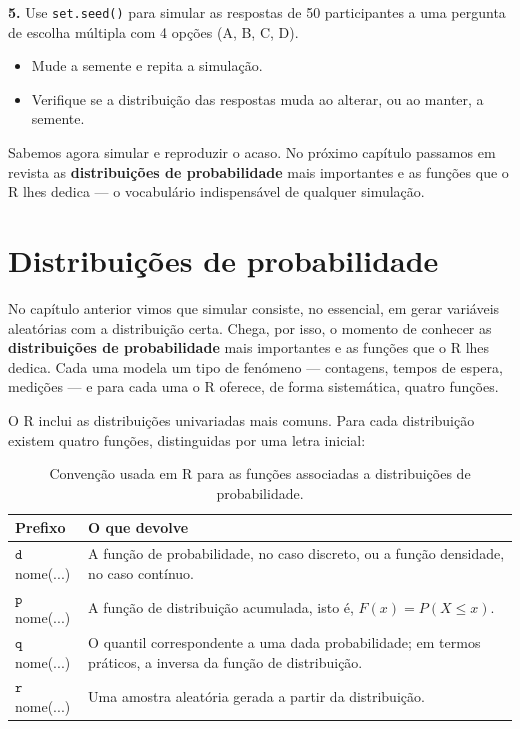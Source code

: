 \documentclass[
  portuguese,
  11pt,
  openany]{book}
\providecommand{\tightlist}{%
  \setlength{\itemsep}{0pt}\setlength{\parskip}{0pt}}
\begin{document}
\textbf{5.} Use \texttt{set.seed()} para simular as respostas de 50 participantes a uma pergunta de
escolha múltipla com 4 opções (A, B, C, D).

\begin{itemize}
\tightlist
\item
  Mude a semente e repita a simulação.
\item
  Verifique se a distribuição das respostas muda ao alterar, ou ao manter, a semente.
\end{itemize}

Sabemos agora simular e reproduzir o acaso. No próximo capítulo passamos em revista as
\textbf{distribuições de probabilidade} mais importantes e as funções que o R lhes dedica ---
o vocabulário indispensável de qualquer simulação.

\chapter{Distribuições de probabilidade}\label{distribuicoes}

No capítulo anterior vimos que simular consiste, no essencial, em gerar variáveis
aleatórias com a distribuição certa. Chega, por isso, o momento de conhecer as
\textbf{distribuições de probabilidade} mais importantes e as funções que o R lhes dedica.
Cada uma modela um tipo de fenómeno --- contagens, tempos de espera, medições --- e para
cada uma o R oferece, de forma sistemática, quatro funções.

O R inclui as distribuições univariadas mais comuns. Para cada distribuição existem
quatro funções, distinguidas por uma letra inicial:

\begin{table}

\caption{\label{tab:tab-funcoes-distribuicoes}Convenção usada em R para as funções associadas a distribuições de probabilidade.}
\centering
\begin{tabular}[t]{l|l}
\hline
Prefixo & O que devolve\\
\hline
$\texttt{d}$nome(...) & A função de probabilidade, no caso discreto, ou a função densidade, no caso contínuo.\\
\hline
$\texttt{p}$nome(...) & A função de distribuição acumulada, isto é, $F(x)=P(X\leq x)$.\\
\hline
$\texttt{q}$nome(...) & O quantil correspondente a uma dada probabilidade; em termos práticos, a inversa da função de distribuição.\\
\hline
$\texttt{r}$nome(...) & Uma amostra aleatória gerada a partir da distribuição.\\
\hline
\end{tabular}
\end{table}
\end{document}
